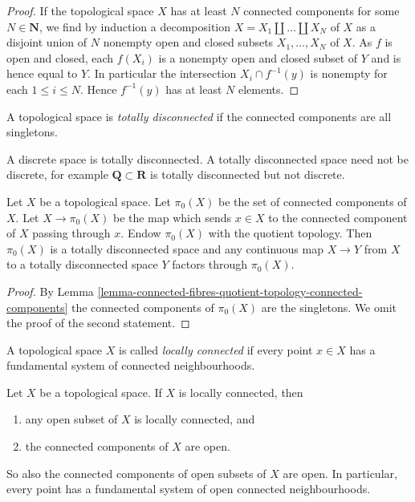\begin{proof}
If the topological space $X$ has at least $N$ connected components for some
$N \in \mathbf{N}$, we find by induction a decomposition
$X = X_1 \amalg \ldots \amalg X_N$ of $X$ as a disjoint union of $N$ nonempty
open and closed subsets $X_1, \ldots , X_N$ of $X$. As $f$ is open and closed,
each $f(X_i)$ is a nonempty open and closed subset of $Y$ and is hence equal to
$Y$. In particular the intersection $X_i \cap f^{-1}(y)$ is nonempty for each
$1 \leq i \leq N$. Hence $f^{-1}(y)$ has at least $N$ elements.
\end{proof}

\begin{definition}
\label{definition-totally-disconnected}
A topological space is {\it totally disconnected} if the connected components
are all singletons.
\end{definition}

\noindent
A discrete space is totally disconnected.
A totally disconnected space need not be discrete, for example
$\mathbf{Q} \subset \mathbf{R}$ is totally disconnected but not discrete.

\begin{lemma}
\label{lemma-space-connected-components}
Let $X$ be a topological space. Let $\pi_0(X)$ be the set of connected
components of $X$. Let $X \to \pi_0(X)$ be the map which sends
$x \in X$ to the connected component of $X$ passing through $x$.
Endow $\pi_0(X)$ with the quotient topology. Then $\pi_0(X)$ is a
totally disconnected space and any continuous map $X \to Y$
from $X$ to a totally disconnected space $Y$ factors through $\pi_0(X)$.
\end{lemma}

\begin{proof}
By Lemma
\ref{lemma-connected-fibres-quotient-topology-connected-components}
the connected components of $\pi_0(X)$ are the singletons.
We omit the proof of the second statement.
\end{proof}

\begin{definition}
\label{definition-locally-connected}
A topological space $X$ is called {\it locally connected} if
every point $x \in X$ has a fundamental system of connected neighbourhoods.
\end{definition}

\begin{lemma}
\label{lemma-locally-connected}
Let $X$ be a topological space. If $X$ is locally connected, then
\begin{enumerate}
\item any open subset of $X$ is locally connected, and
\item the connected components of $X$ are open.
\end{enumerate}
So also the connected components of open subsets of $X$ are open.
In particular, every point has a fundamental system of open connected
neighbourhoods.
\end{lemma}

